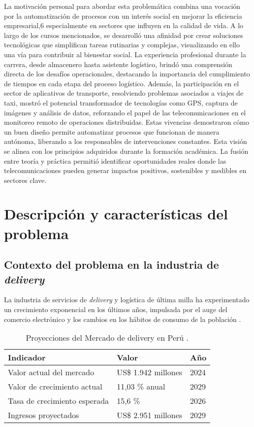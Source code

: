 La motivación personal para abordar esta problemática combina una vocación por la
automatización de procesos con un interés social en mejorar la eficiencia empresarial,6
especialmente en sectores que influyen en la calidad de vida. A lo largo de los cursos
mencionados, se desarrolló una afinidad por crear soluciones tecnológicas que simplifican
tareas rutinarias y complejas, visualizando en ello una vía para contribuir al bienestar social.
La experiencia profesional durante la carrera, desde almacenero hasta asistente logístico, brindó
una comprensión directa de los desafíos operacionales, destacando la importancia del
cumplimiento de tiempos en cada etapa del proceso logístico. Además, la participación en el
sector de aplicativos de transporte, resolviendo problemas asociados a viajes de taxi, mostró el
potencial transformador de tecnologías como GPS, captura de imágenes y análisis de datos,
reforzando el papel de las telecomunicaciones en el monitoreo remoto de operaciones
distribuidas.
Estas vivencias demostraron cómo un buen diseño permite automatizar procesos que funcionan
de manera autónoma, liberando a los responsables de intervenciones constantes. Esta visión se
alinea con los principios adquiridos durante la formación académica. La fusión entre teoría y
práctica permitió identificar oportunidades reales donde las telecomunicaciones pueden generar
impactos positivos, sostenibles y medibles en sectores clave.
\section{Descripción y características del problema}

\subsection{Contexto del problema en la industria de \textit{delivery}}

La industria de servicios de \textit{delivery} y logística de última milla ha experimentado un crecimiento exponencial en los últimos años, impulsada por el auge del comercio electrónico y los cambios en los hábitos de consumo de la población \cite{RedacciponTLW2025}. 

\begin{table}[H]
\centering
\caption{Proyecciones del Mercado de delivery en Perú \cite{WebRef13249}.}
\label{tab:proyecciones_delivery}
\begin{tabular}{@{}p{5.5cm}p{3.5cm}p{2cm}@{}}
\toprule
\textbf{Indicador} & \textbf{Valor} & \textbf{Año} \\
\midrule
Valor actual del mercado & US\$ 1.942 millones & 2024 \\
\addlinespace
Valor de crecimiento actual & 11,03 \% anual & 2029 \\
\addlinespace
Tasa de crecimiento esperada & 15,6 \% & 2026 \\
\addlinespace
Ingresos proyectados & US\$ 2.951 millones & 2029 \\
\bottomrule
\end{tabular}
\end{table}

